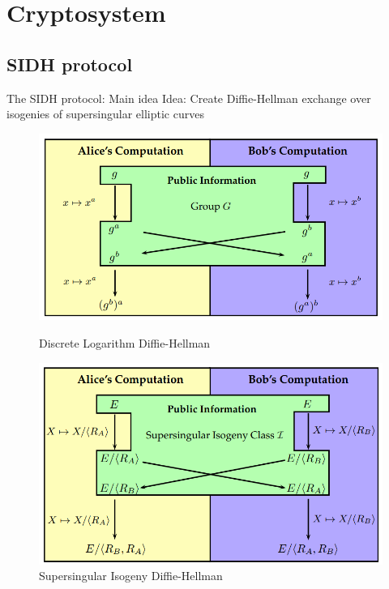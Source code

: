 \documentclass{beamer}
\begin{document}
\section{Cryptosystem}

\subsection{SIDH protocol}

\begin{frame}{The SIDH protocol: Main idea}
Idea: Create Diffie-Hellman exchange over isogenies of supersingular elliptic curves %
\begin{figure}
	\begin{minipage}{0.5\textwidth}
		\centering
		\includegraphics[width=1\linewidth]{DLDH}
		\caption{Discrete Logarithm Diffie-Hellman}\label{fig:dldh}
	\end{minipage}\hfill
	\begin{minipage}{0.48\textwidth}
		\centering
		\includegraphics[width=1\linewidth]{SIDH}
		\caption{Supersingular Isogeny Diffie-Hellman}\label{fig:sidh}
	\end{minipage}
\end{figure}

\end{frame}
\end{document}
